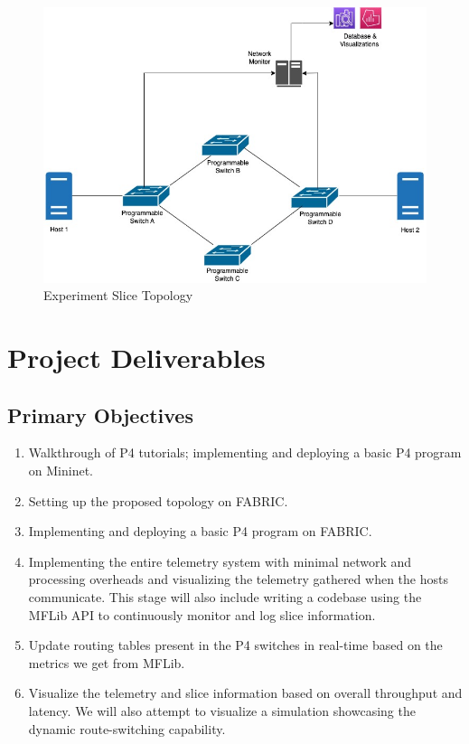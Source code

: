 \documentclass[conference]{IEEEtran}
\begin{document}
    \begin{figure}[h!]
        \centering
        \includegraphics[scale=0.3]{Project_Proposal_Topology.jpeg}
        \caption{Experiment Slice Topology}
    \end{figure}


    \section{Project Deliverables}

    \subsection{Primary Objectives}
    \begin{enumerate}
        \item Walkthrough of P4 tutorials; implementing and deploying a basic P4 program on Mininet.
        \item Setting up the proposed topology on FABRIC.
        \item Implementing and deploying a basic P4 program on FABRIC.
        \item Implementing the entire telemetry system with minimal network and processing overheads and visualizing the telemetry gathered when the hosts communicate. This stage will also include writing a codebase using the MFLib API to continuously monitor and log slice information.
        \item Update routing tables present in the P4 switches in real-time based on the metrics we get from MFLib.
        \item Visualize the telemetry and slice information based on overall throughput and latency. We will also attempt to visualize a simulation showcasing the dynamic route-switching capability.
    \end{enumerate}
\end{document}
